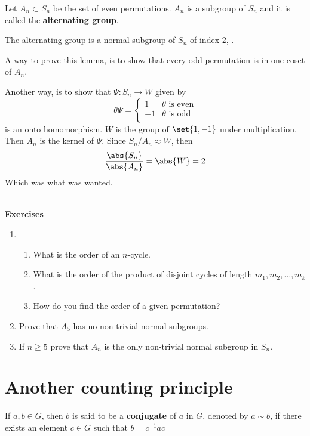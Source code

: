 Let \(A_n \subset S_n\) be the set of even permutations. \(A_n\) is a subgroup of \(S_n\) and it is called the \textbf{alternating group}. 
\begin{lemma}
    The alternating group is a normal subgroup of \(S_n\) of index \(2\), .
\end{lemma}
\begin{prooflemma}
    A way to prove this lemma, is to show that every odd permutation is in one coset of \(A_n\).
    
    Another way, is to show that \(\Psi:S_n \to W\) given by 
    \begin{equation*}
        \theta \Psi = \begin{cases}
            1 & \theta \text{ is even}\\
            -1 & \theta \text{ is odd}\\
        \end{cases}
    \end{equation*}
    is an onto homomorphism. \(W\) is the group of \(\set{1,-1}\) under multiplication. Then \(A_n\) is the kernel of \(\Psi\). Since \(S_n/A_n \approx W\), then 
    \begin{equation*}
        \dfrac{\abs{S_n}}{\abs{A_n}} = \abs{W} = 2
    \end{equation*}
    Which was what was wanted.
\end{prooflemma}
\ \\ 
{\Large{\textbf{Exercises}}}
\begin{enumerate}
    \item  
    \begin{enumerate}
        \item What is the order of an \(n\)-cycle.
        \item What is the order of the product of disjoint cycles of length \(m_1,m_2, \dots , m_k\).
        \item How do you find the order of a given permutation?
    \end{enumerate}
    \item Prove that \(A_5\) has no non-trivial normal subgroups.
    \item If \(n \geq 5\) prove that \(A_n\) is the only non-trivial normal subgroup in \(S_n\).
\end{enumerate}
\section{Another counting principle} 
\begin{definition}
    If \(a,b \in G\), then \(b\) is said to be a \textbf{conjugate} of \(a\) in \(G\), denoted by \(a \sim b\), if there exists an element \(c \in G\) such that \(b = c^{-1}ac\)
\end{definition}

